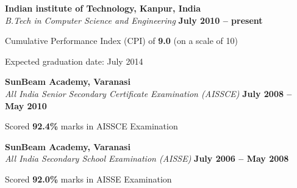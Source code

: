 \documentclass[margin,line]{resume}
\begin{document}
\begin{resume}
    \textbf{Indian institute of Technology, Kanpur, India} \vspace{2mm}\\\vspace{1mm}%
    \textsl{B.Tech in Computer Science and Engineering} \hfill \textbf{ July 2010 -- present}\vspace{-3mm}\\\vspace{-1mm}%
    \begin{list2}
    	\item Cumulative Performance Index (CPI) of \textbf{\textsf{9.0}} (on a scale of 10)
        \item Expected graduation date: July 2014
    \end{list2}\vspace{-1.5mm}
    \textbf{SunBeam Academy, Varanasi} \vspace{2mm}\\\vspace{1mm}%
    \textsl{All India Senior Secondary Certificate Examination (AISSCE)} \hfill \textbf{ July 2008 -- May 2010}\vspace{-3mm}\\\vspace{-1mm}%
    \begin{list2}
    	\item Scored \textbf{\textsf{92.4\%}} marks in AISSCE Examination 
    \end{list2}
    \textbf{SunBeam Academy, Varanasi} \vspace{2mm}\\\vspace{1mm}%
    \textsl{All India Secondary School Examination (AISSE)} \hfill \textbf{ July 2006 -- May 2008}\vspace{-3mm}\\\vspace{-1mm}%
    \begin{list2}
    	\item Scored \textbf{\textsf {92.0\%}} marks in AISSE Examination 
    \end{list2}
    \vspace{-1mm}%



\end{resume}
\end{document}
